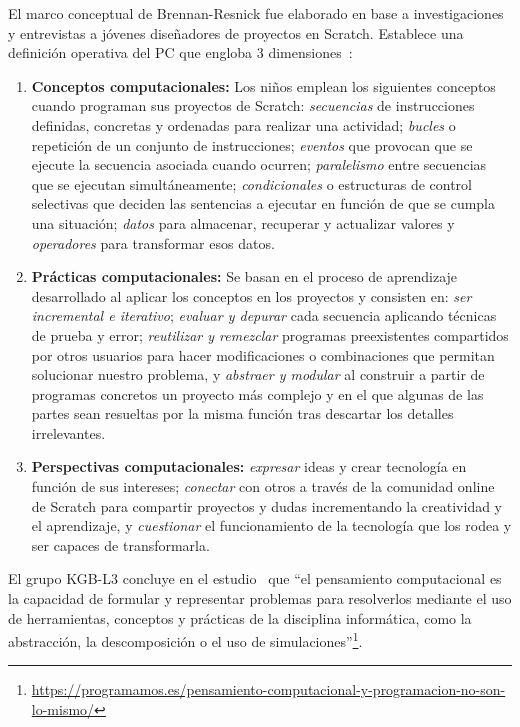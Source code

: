 \documentclass[a4paper, 12pt]{book}
\begin{document}
El marco conceptual de Brennan-Resnick fue elaborado en base a investigaciones y entrevistas a jóvenes diseñadores de proyectos en Scratch. Establece una definición operativa del PC que engloba 3 dimensiones~\cite{brennan2012new}: 
\begin{enumerate}
    \item \textbf{Conceptos computacionales:} Los niños emplean los siguientes conceptos cuando programan sus proyectos de Scratch: \emph{secuencias} de instrucciones definidas, concretas y ordenadas para realizar una actividad; \emph{bucles} o repetición de un conjunto de instrucciones; \emph{eventos} que provocan que se ejecute la secuencia asociada cuando ocurren; \emph{paralelismo} entre secuencias que se ejecutan simultáneamente; \emph{condicionales} o estructuras de control selectivas que deciden las sentencias a ejecutar en función de que se cumpla una situación; \emph{datos} para almacenar, recuperar y actualizar valores y \emph{operadores} para transformar esos datos.  
    \item \textbf{Prácticas computacionales:} Se basan en el proceso de aprendizaje desarrollado al aplicar los conceptos en los proyectos y consisten en: \emph{ser incremental e iterativo}; \emph{evaluar y depurar} cada secuencia aplicando técnicas de prueba y error;
    \emph{reutilizar y remezclar} programas preexistentes compartidos por otros usuarios para hacer modificaciones o combinaciones que permitan solucionar nuestro problema, y \emph{abstraer y modular} al construir a partir de programas concretos un proyecto más complejo y en el que algunas de las partes sean resueltas por la misma función tras descartar los detalles irrelevantes.    
    \item \textbf{Perspectivas computacionales:} \emph{expresar} ideas y crear tecnología en función de sus intereses; \emph{conectar} con otros a través de la comunidad online de Scratch para compartir proyectos y dudas incrementando la creatividad y el aprendizaje, y \emph{cuestionar} el funcionamiento de la tecnología que los rodea y ser capaces de transformarla.
\end{enumerate} 

El grupo KGB-L3 concluye en el estudio~\cite[p. 8]{moreno19programming} que ``el pensamiento computacional es la capacidad de formular y representar problemas para resolverlos mediante el uso de herramientas, conceptos y prácticas de la disciplina informática, como la abstracción, la descomposición o el uso de simulaciones''\footnote{\url{https://programamos.es/pensamiento-computacional-y-programacion-no-son-lo-mismo/}}.
\end{document}
